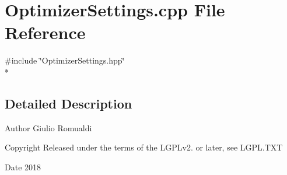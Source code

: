 \section{Optimizer\+Settings.\+cpp File Reference}
\label{OptimizerSettings_8cpp}
{\ttfamily \#include \char`\"{}Optimizer\+Settings.\+hpp\char`\"{}}\\*


\subsection{Detailed Description}
\begin{DoxyAuthor}{Author}
Giulio Romualdi 
\end{DoxyAuthor}
\begin{DoxyCopyright}{Copyright}
Released under the terms of the L\+G\+P\+Lv2. or later, see L\+G\+P\+L.\+T\+XT 
\end{DoxyCopyright}
\begin{DoxyDate}{Date}
2018 
\end{DoxyDate}
